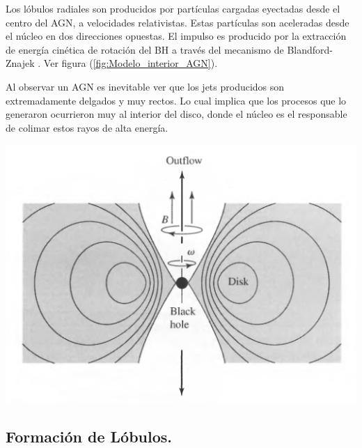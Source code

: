 Los lóbulos radiales son producidos por partículas cargadas eyectadas desde el centro del AGN, a velocidades relativistas. Estas partículas son aceleradas desde el núcleo en dos direcciones opuestas. El impulso es producido por la extracción de energía cinética de rotación del BH a través del mecanismo de Blandford- Znajek \cite{blandford1977}. Ver figura (\ref{fig:Modelo_interior_AGN}).%

Al observar un AGN es inevitable ver que los jets producidos son extremadamente delgados y muy rectos. Lo cual implica  que los procesos que lo generaron ocurrieron muy al interior del disco, donde el núcleo es el responsable de colimar estos rayos de alta energía. %
%
\begin{center}
\includegraphics[scale=.5]{./figures/3_AGNs/Jets.png}
\label{fig:Modelo_interior_AGN}
\end{center}

	\subsection{Formación de Lóbulos.}
	\label{subsec:Formation_lobules}

